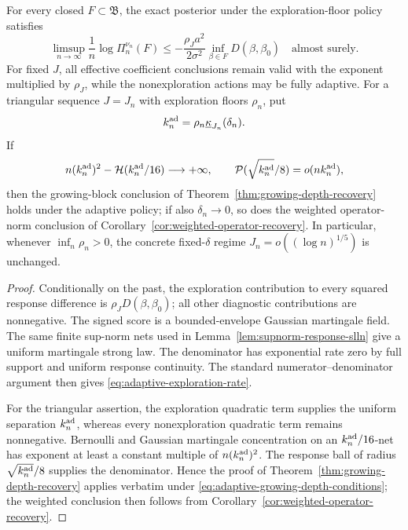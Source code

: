 \begin{theorem}
\label{thm:adaptive-exploration-floor}
For every closed \(F\subset\mathfrak B\), the exact posterior under the
exploration-floor policy satisfies
\begin{equation}
 \limsup_{n\to\infty}\frac1n\log\Pi_n^{\nu_n}(F)
 \le-\frac{\rho_Ja^2}{2\sigma^2}
       \inf_{\beta\in F}D(\beta,\beta_0)
 \quad\text{almost surely}.
 \label{eq:adaptive-exploration-rate}
\end{equation}
For fixed \(J\), all effective coefficient conclusions remain valid with the
exponent multiplied by \(\rho_J\), while the nonexploration actions may be
fully adaptive.  For a triangular sequence \(J=J_n\) with exploration floors
\(\rho_n\), put
\[
 k_n^{\rm ad}=\rho_n\underline\kappa_{J_n}(\delta_n).
\]
If
\begin{equation}
 n(k_n^{\rm ad})^2-\mathcal H(k_n^{\rm ad}/16)\longrightarrow+\infty,
 \qquad
 \mathcal P(\sqrt{k_n^{\rm ad}}/8)=o(nk_n^{\rm ad}),
 \label{eq:adaptive-growing-depth-conditions}
\end{equation}
then the growing-block conclusion of
Theorem~\ref{thm:growing-depth-recovery} holds under the adaptive policy; if
also \(\delta_n\to0\), so does the weighted operator-norm conclusion of
Corollary~\ref{cor:weighted-operator-recovery}.  In particular, whenever
\(\inf_n\rho_n>0\), the concrete fixed-\(\delta\) regime
\(J_n=o((\log n)^{1/5})\) is unchanged.
\end{theorem}

\begin{proof}
Conditionally on the past, the exploration contribution to every squared
response difference is \(\rho_JD(\beta,\beta_0)\); all other diagnostic
contributions are nonnegative.  The signed score is a bounded-envelope
Gaussian martingale field.  The same finite sup-norm nets used in
Lemma~\ref{lem:supnorm-response-slln} give a uniform martingale strong law.
The denominator has exponential rate zero by full support and uniform response
continuity.  The standard numerator--denominator argument then gives
\eqref{eq:adaptive-exploration-rate}.

For the triangular assertion, the exploration quadratic term supplies the
uniform separation \(k_n^{\rm ad}\), whereas every nonexploration quadratic
term remains nonnegative.  Bernoulli and Gaussian martingale concentration on
an \(k_n^{\rm ad}/16\)-net has exponent at least a constant multiple of
\(n(k_n^{\rm ad})^2\).  The response ball of radius
\(\sqrt{k_n^{\rm ad}}/8\) supplies the denominator.  Hence the proof of
Theorem~\ref{thm:growing-depth-recovery} applies verbatim under
\eqref{eq:adaptive-growing-depth-conditions}; the weighted conclusion then
follows from Corollary~\ref{cor:weighted-operator-recovery}.
\end{proof}

